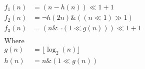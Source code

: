 \documentclass[border=3pt]{standalone}
\def\BitAnd{\mathbin{\&}}
\def\ShiftLeft{\ll}
\def\ShiftRight{\gg}
\def\BitNeg{\ensuremath{\mathord{\lnot}}}  %
\begin{document}
$ \displaystyle
    \begin{aligned} 
        f_1(n) &= (n - h(n)) \ShiftLeft 1 + 1\\%
        f_2(n) &= \BitNeg h(2n) \BitAnd ((n \ShiftLeft 1) \ShiftRight 1)\\%
        f_3(n) &= (n \BitAnd \BitNeg (1 \ShiftLeft g(n))) \ShiftLeft 1 + 1\\%
		\\
		\text{Where}\\%
        g(n) &= \lfloor\log_2(n)\rfloor\\%
        h(n) &= n \BitAnd (1 \ShiftLeft g(n))%
    \end{aligned}
$
\end{document}
